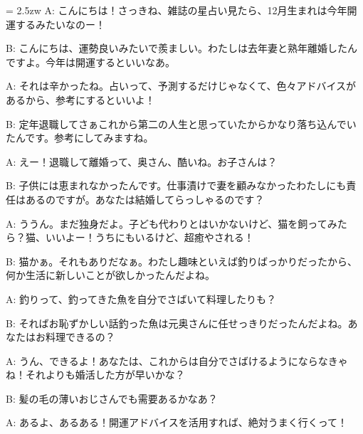 \documentclass[11pt]{amsart}
\title{}
\author{}
\newenvironment{hangall}[1]{\hangindent = 2.5zw\everypar{\hangindent = 2.5zw}}{}
\begin{document}
\maketitle
\begin{hangall}{}%
A: こんにちは！さっきね、雑誌の星占い見たら、12月生まれは今年開運するみたいなのー！

B: こんにちは、運勢良いみたいで羨ましい。わたしは去年妻と熟年離婚したんですよ。今年は開運するといいなあ。

A: それは辛かったね。占いって、予測するだけじゃなくて、色々アドバイスがあるから、参考にするといいよ！

B: 定年退職してさぁこれから第二の人生と思っていたからかなり落ち込んでいたんです。参考にしてみますね。

A: えー！退職して離婚って、奥さん、酷いね。お子さんは？

B: 子供には恵まれなかったんです。仕事漬けで妻を顧みなかったわたしにも責任はあるのですが。あなたは結婚してらっしゃるのです？

A: ううん。まだ独身だよ。子ども代わりとはいかないけど、猫を飼ってみたら？猫、いいよー！うちにもいるけど、超癒やされる！

B: 猫かぁ。それもありだなぁ。わたし趣味といえば釣りばっかりだったから、何か生活に新しいことが欲しかったんだよね。

A: 釣りって、釣ってきた魚を自分でさばいて料理したりも？

B: そればお恥ずかしい話釣った魚は元奥さんに任せっきりだったんだよね。あなたはお料理できるの？

A: うん、できるよ！あなたは、これからは自分でさばけるようにならなきゃね！それよりも婚活した方が早いかな？

B: 髪の毛の薄いおじさんでも需要あるかなあ？

A: あるよ、あるある！開運アドバイスを活用すれば、絶対うまく行くって！
\end{hangall}
\end{document}
